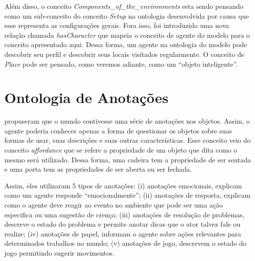 Além disso, o conceito \emph{Components\_of\_the\_environments} esta sendo
pensando como um sub-conceito do conceito \emph{Setup} na ontologia
desenvolvida por causa que esse representa as configurações gerais.
%
Fora isso, foi introduzido uma nova relação chamada \emph{hasCharacter} que
mapeia o conceito de agente do modelo \occ para o conceito apresentado aqui.
Dessa forma, um agente na ontologia do
modelo \occ pode descobrir seu perfil e descobrir seus locais visitados
regularmente. O conceito de \emph{Place} pode ser pensado, como veremos
adiante, como um ``objeto inteligente''.


\section{Ontologia de Anotações} \label{ch:aec:oda}

\citet{doyle1998annotated} propuseram que o mundo contivesse uma série de
anotações nos objetos. Assim, o agente poderia conhecer apenas a forma de
questionar os objetos sobre suas formas de usar, suas descrições e suas outras
características. Esse conceito veio do conceito \emph{affordance} que se
refere a propriedade de um objeto que dita como o mesmo será utilizado.
Dessa forma, uma cadeira tem a propriedade de ser sentada e uma porta tem as
propriedades de ser aberta ou ser fechada.

Assim, eles utilizaram 5 tipos de anotações: (i) anotações emocionais,
explicam como um agente responde ``emocionalmente''; (ii) anotações de
resposta, explicam como o agente deve reagir ao evento no ambiente que pode ser
uma ação especifica ou uma sugestão de crença; (iii) anotações de resolução de
problemas, descreve o estado do problema e permite anotar dicas que o ator
talvez fale ou realize; (iv) anotações de papel, informam o agente sobre ações
relevantes para determinados trabalhos no mundo; (v) anotações de jogo,
descrevem o estado do jogo permitindo sugerir movimentos.

